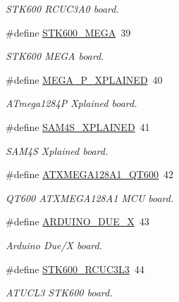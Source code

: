 \begin{DoxyCompactItemize}
\begin{DoxyCompactList}\small\item\em S\+T\+K600 R\+C\+U\+C3\+A0 board. \end{DoxyCompactList}\item 
\#define \mbox{\hyperlink{group__group__common__boards_ga1d0450ec7f13a095b96372d5142053a5}{S\+T\+K600\+\_\+\+M\+E\+GA}}~39
\begin{DoxyCompactList}\small\item\em S\+T\+K600 M\+E\+GA board. \end{DoxyCompactList}\item 
\#define \mbox{\hyperlink{group__group__common__boards_gac0cd34c69edc3e4bff3f60335ceb9523}{M\+E\+G\+A\+\_\+P\+\_\+\+X\+P\+L\+A\+I\+N\+ED}}~40
\begin{DoxyCompactList}\small\item\em A\+Tmega1284P Xplained board. \end{DoxyCompactList}\item 
\#define \mbox{\hyperlink{group__group__common__boards_gafbe1a5c573b19cb81096a5e74bf02c5b}{S\+A\+M4\+S\+\_\+\+X\+P\+L\+A\+I\+N\+ED}}~41
\begin{DoxyCompactList}\small\item\em S\+A\+M4S Xplained board. \end{DoxyCompactList}\item 
\#define \mbox{\hyperlink{group__group__common__boards_ga71c98fe89b8fdd9d764fe26eecb06d2d}{A\+T\+X\+M\+E\+G\+A128\+A1\+\_\+\+Q\+T600}}~42
\begin{DoxyCompactList}\small\item\em Q\+T600 A\+T\+X\+M\+E\+G\+A128\+A1 M\+CU board. \end{DoxyCompactList}\item 
\#define \mbox{\hyperlink{group__group__common__boards_gaada45a3e41c9f2ecf1332b408e9903ec}{A\+R\+D\+U\+I\+N\+O\+\_\+\+D\+U\+E\+\_\+X}}~43
\begin{DoxyCompactList}\small\item\em Arduino Due/X board. \end{DoxyCompactList}\item 
\#define \mbox{\hyperlink{group__group__common__boards_ga4a22ba3ca235e7f9401724437fe8b23e}{S\+T\+K600\+\_\+\+R\+C\+U\+C3\+L3}}~44
\begin{DoxyCompactList}\small\item\em A\+T\+U\+C\+L3 S\+T\+K600 board. \end{DoxyCompactList}\item 

\end{DoxyCompactItemize}
